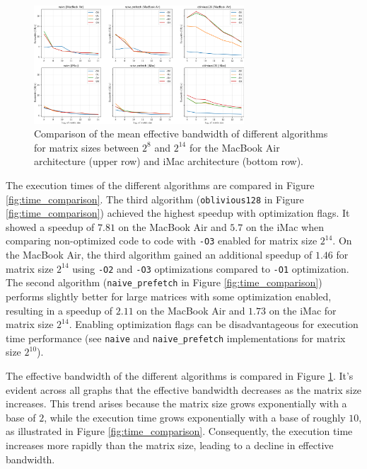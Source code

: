 \documentclass[conference]{IEEEtran}
\begin{document}
    \begin{figure}[htbp]
        \centering
        \includegraphics[width=0.7\textwidth]{./images/bandwidth_comparision.png}
        \caption{Comparison of the mean effective bandwidth of different algorithms for matrix sizes between $2^8$ and $2^{14}$ for the MacBook Air architecture (upper row) and iMac architecture (bottom row).}
        \label{fig:bandwidth_comparison}  
    \end{figure}

    The execution times of the different algorithms are compared in Figure \ref{fig:time_comparison}.
    The third algorithm (\texttt{oblivious128} in Figure \ref{fig:time_comparison}) achieved the highest speedup with optimization flags. It showed a speedup of $7.81$ on the MacBook Air and $5.7$ on the iMac when comparing non-optimized code to code with \texttt{-O3} enabled for matrix size $2^{14}$.
    On the MacBook Air, the third algorithm gained an additional speedup of $1.46$ for matrix size $2^{14}$ using \texttt{-O2} and \texttt{-O3} optimizations compared to \texttt{-O1} optimization.
    The second algorithm (\texttt{naive\_prefetch} in Figure \ref{fig:time_comparison}) performs slightly better for large matrices with some optimization enabled, resulting in a speedup of $2.11$ on the MacBook Air and $1.73$ on the iMac for matrix size $2^{14}$.
    Enabling optimization flags can be disadvantageous for execution time performance (see \texttt{naive} and \texttt{naive\_prefetch} implementations for matrix size $2^{10}$).

    The effective bandwidth of the different algorithms is compared in Figure \ref{fig:bandwidth_comparison}. It's evident across all graphs that the effective bandwidth decreases as the matrix size increases. This trend arises because the matrix size grows exponentially with a base of $2$, while the execution time grows exponentially with a base of roughly $10$, as illustrated in Figure \ref{fig:time_comparison}. Consequently, the execution time increases more rapidly than the matrix size, leading to a decline in effective bandwidth.
\end{document}
